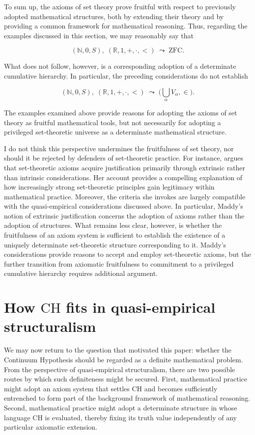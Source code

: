 \documentclass[11pt,a4paper]{article}
\begin{document}
To sum up, the axioms of set theory prove fruitful with respect to previously adopted mathematical structures, both by extending their theory and by providing a common framework for mathematical reasoning. Thus, regarding the examples discussed in this section, we may reasonably say that

$$(\mathbb N,0,S), \; (\mathbb{R},1, +, \cdot, <) \; \leadsto \; \mathrm{ZFC}.$$

What does not follow, however, is a corresponding adoption of a determinate cumulative hierarchy. In particular, the preceding considerations do not establish

$$(\mathbb N,0,S), \; (\mathbb{R},1, +, \cdot, <) \; \leadsto \; \big( \bigcup_{\alpha}V_\alpha,\in \big).$$

The examples examined above provide reasons for adopting the axioms of set theory as fruitful mathematical tools, but not necessarily for adopting a privileged set-theoretic universe as a determinate mathematical structure.
 
I do not think this perspective undermines the fruitfulness of set theory, nor should it be rejected by defenders of set-theoretic practice. For instance, \textcite{maddy1988believing1,maddy1988believing2} argues that set-theoretic axioms acquire justification primarily through extrinsic rather than intrinsic considerations. Her account provides a compelling explanation of how increasingly strong set-theoretic principles gain legitimacy within mathematical practice. Moreover, the criteria she invokes are largely compatible with the quasi-empirical considerations discussed above. In particular, Maddy's notion of extrinsic justification concerns the adoption of axioms rather than the adoption of structures. What remains less clear, however, is whether the fruitfulness of an axiom system is sufficient to establish the existence of a uniquely determinate set-theoretic structure corresponding to it. Maddy's considerations provide reasons to accept and employ set-theoretic axioms, but the further transition from axiomatic fruitfulness to commitment to a privileged cumulative hierarchy requires additional argument.

\section{How \texorpdfstring{$\mathrm{CH}$}{CH} fits in quasi-empirical structuralism}
\label{section-CH-case}

We may now return to the question that motivated this paper: whether the Continuum Hypothesis should be regarded as a definite mathematical problem. From the perspective of quasi-empirical structuralism, there are two possible routes by which such definiteness might be secured. First, mathematical practice might adopt an axiom system that settles $\mathrm{CH}$ and becomes sufficiently entrenched to form part of the background framework of mathematical reasoning. Second, mathematical practice might adopt a determinate structure in whose language $\mathrm{CH}$ is evaluated, thereby fixing its truth value independently of any particular axiomatic extension.
\end{document}
